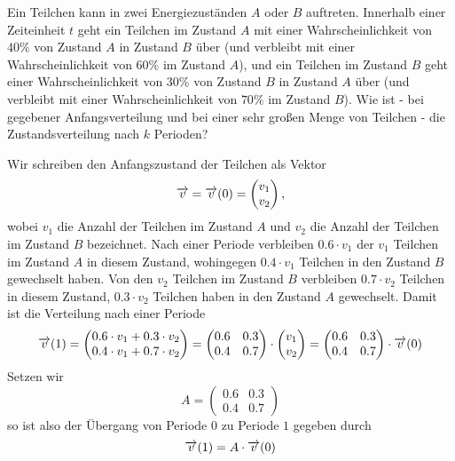 \begin{beispiel} Ein Teilchen kann in zwei Energiezuständen $A$ oder $B$ auftreten. Innerhalb einer Zeiteinheit $t$ 
geht ein Teilchen im Zustand $A$ mit einer Wahrscheinlichkeit von $40\%$ von Zustand $A$ in Zustand $B$ über 
(und verbleibt mit einer Wahrscheinlichkeit von $60\%$ im Zustand $A$), und ein Teilchen im Zustand $B$ geht 
einer Wahrscheinlichkeit von $30\%$ von Zustand $B$ in Zustand $A$ über (und verbleibt mit einer Wahrscheinlichkeit 
von $70\%$ im Zustand $B$). Wie ist - bei gegebener Anfangsverteilung und bei einer sehr großen Menge von 
Teilchen - die Zustandsverteilung nach $k$ Perioden?

Wir schreiben den Anfangszustand der Teilchen als Vektor 
  	$$ \overrightarrow{v} = \overrightarrow{v}(0) = \left( \begin{matrix} v_1 \\ v_2 \end{matrix} \right), $$ 
wobei $v_1$ die Anzahl der Teilchen im Zustand $A$ und $v_2$ die Anzahl der Teilchen im Zustand $B$ 
bezeichnet. Nach einer Periode verbleiben $0.6 \cdot v_1$ der $v_1$ Teilchen im Zustand $A$ in diesem Zustand, 
wohingegen $0.4 \cdot v_1$ Teilchen in den Zustand $B$ gewechselt haben. Von den $v_2$ Teilchen im Zustand 
$B$ verbleiben $0.7 \cdot v_2$ Teilchen in diesem Zustand, $0.3 \cdot v_2$ Teilchen 
haben in den Zustand $A$ gewechselt. Damit ist die Verteilung nach einer Periode
  	$$ \overrightarrow{v}(1) = \left( \begin{matrix} 0.6 \cdot v_1 + 0.3 \cdot v_2 \\ 0.4 \cdot v_1 + 0.7 \cdot v_2 
   	\end{matrix} \right) = \left( \begin{matrix} 0.6 & 0.3 \\ 0.4 & 0.7 \end{matrix} \right) \cdot 
   	\left( \begin{matrix} v_1 \\ v_2 \end{matrix} \right) =
   	\left( \begin{matrix} 0.6 & 0.3 \\ 0.4 & 0.7 \end{matrix} \right) \cdot \overrightarrow{v}(0) $$
Setzen wir 
 	$$ A = \left( \begin{matrix} 0.6 & 0.3 \\ 0.4 & 0.7 \end{matrix} \right) $$
so ist also der Übergang von Periode $0$ zu Periode $1$ gegeben durch 
  	$$ \overrightarrow{v}(1) = A \cdot \overrightarrow{v}(0) $$

\end{beispiel}
